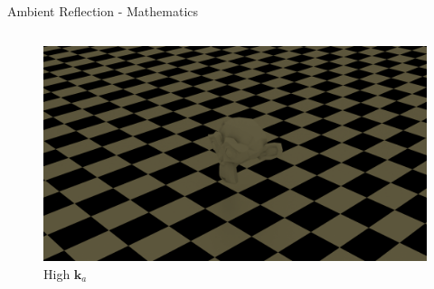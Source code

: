 \begin{frame}{Ambient Reflection - Mathematics}
\begin{columns}
\begin{column}{0.4\textwidth}
{        \begin{figure}
          \includegraphics[width=\linewidth]{images/ambient.png}
          \caption*{High $\mathbf{k}_a$}
        \end{figure}
      }
    \end{column}
  \end{columns}
\end{frame}
